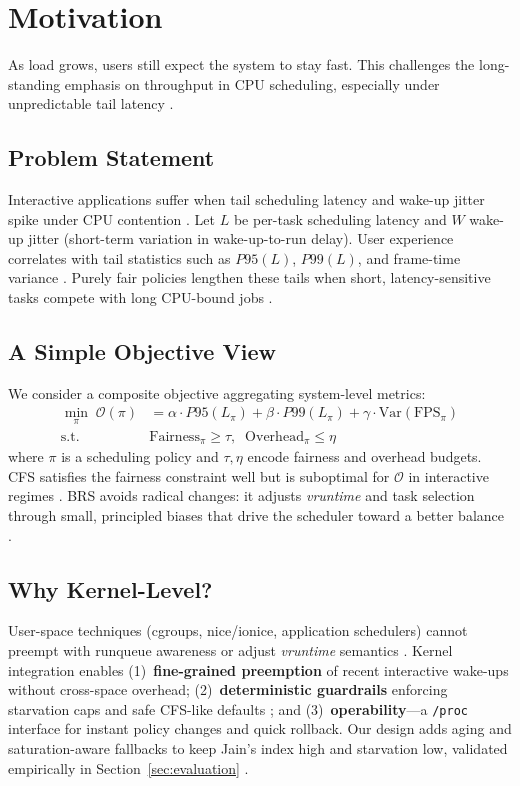 \section{Motivation}
\label{sec:motivation}

As load grows, users still expect the system to stay fast. This challenges the long-standing emphasis on throughput in CPU scheduling, especially under unpredictable tail latency \cite{Bouron2018Battle,10306992}.

\subsection{Problem Statement}
Interactive applications suffer when tail scheduling latency and wake-up jitter spike under CPU contention \cite{10306992}. Let $L$ be per-task scheduling latency and $W$ wake-up jitter (short-term variation in wake-up-to-run delay). User experience correlates with tail statistics such as $P95(L)$, $P99(L)$, and frame-time variance \cite{8762113}. Purely fair policies lengthen these tails when short, latency-sensitive tasks compete with long CPU-bound jobs \cite{Bouron2018Battle}.

\subsection{A Simple Objective View}
We consider a composite objective aggregating system-level metrics:
\begin{equation}
\begin{split}
\min_{\pi}\; \mathcal{O}(\pi) &= \alpha \cdot P95(L_{\pi}) + \beta \cdot P99(L_{\pi}) + \gamma \cdot \mathrm{Var}(\mathrm{FPS}_{\pi}) \\
\text{s.t.}\;& \mathrm{Fairness}_{\pi} \ge \tau,\;\; \mathrm{Overhead}_{\pi} \le \eta
\end{split}
\end{equation}
where $\pi$ is a scheduling policy and $\tau,\eta$ encode fairness and overhead budgets. CFS satisfies the fairness constraint well but is suboptimal for $\mathcal{O}$ in interactive regimes \cite{Bouron2018Battle}. BRS avoids radical changes: it adjusts \textit{vruntime} and task selection through small, principled biases that drive the scheduler toward a better balance \cite{10306992}.

\subsection{Why Kernel-Level?}
User-space techniques (cgroups, nice/ionice, application schedulers) cannot preempt with runqueue awareness or adjust \textit{vruntime} semantics \cite{2020ThreadEK,Bouron2018Battle}. Kernel integration enables (1)~\textbf{fine-grained preemption} of recent interactive wake-ups without cross-space overhead; (2)~\textbf{deterministic guardrails} enforcing starvation caps and safe CFS-like defaults \cite{10306992}; and (3)~\textbf{operability}---a \texttt{/proc} interface for instant policy changes and quick rollback. Our design adds aging and saturation-aware fallbacks to keep Jain's index high and starvation low, validated empirically in Section~\ref{sec:evaluation} \cite{Guo2013JainFairness}.

